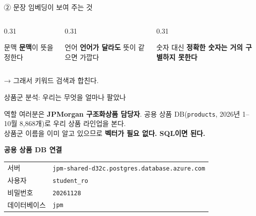 \begin{frame}{ ② 문장 임베딩이 보여 주는 것}
\begin{columns}[T]
\begin{column}{0.31\textwidth}
\begin{block}{문맥}
\textbf{문맥}이 뜻을 정한다\\
\end{block}
\end{column}
\begin{column}{0.31\textwidth}
\begin{block}{언어}
\textbf{언어가 달라도} 뜻이 같으면 가깝다
\end{block}
\end{column}
\begin{column}{0.31\textwidth}
\begin{alertblock}{숫자}
대신 \textbf{정확한 숫자는 거의 구별하지 못한다}
\end{alertblock}
\end{column}
\end{columns}
\vspace{1em}
\begin{center}
→ 그래서 \num{키워드 검색과 합친다}.
\end{center}
\vspace{0.6em}
\end{frame}

\begin{frame}{ 상품군 분석: 우리는 무엇을 얼마나 팔았나 }
\begin{block}{역할}
여러분은 \textbf{JPMorgan 구조화상품 담당자}. 공용 상품 DB(\texttt{products}, 2026년 1–10월 \num{8,868개})로 우리 상품 라인업을 본다.\\[3pt]
상품군 이름을 이미 알고 있으므로 \textbf{벡터가 필요 없다. SQL이면 된다.}
\end{block}
\vspace{0.5em}
\textbf{공용 상품 DB 연결} \\[4pt]
\small
\begin{tabular}{@{}l l@{}}
\toprule
서버 & \texttt{jpm-shared-d32c.postgres.database.azure.com} \\
사용자 & \texttt{student\_ro} \\
비밀번호 & \texttt{20261128} \\
데이터베이스 & \texttt{jpm} \\
\bottomrule
\end{tabular}
\end{frame}

